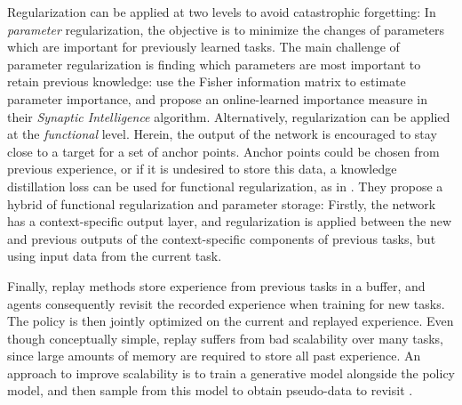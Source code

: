 \documentclass[dvipsnames]{article} %
\newcommand{\commentOLD}[1]{}
\newcommand{\saOLD}[1] {\commentOLD{{\color{cyan} SA: #1}}}                %
\newcommand{\asOLD}[1] {\commentOLD{{\color{orange} AS: #1}}}              %
\begin{document}
Regularization can be applied at two levels to avoid catastrophic forgetting: In \textit{parameter} regularization, the objective is to minimize the changes of parameters which are important for previously learned tasks. The main challenge of parameter regularization is finding which parameters are most important to retain previous knowledge: \citet{ewc} use the Fisher information matrix to estimate parameter importance, and \citet{synapticintelligence} propose an online-learned importance measure in their \textit{Synaptic Intelligence} algorithm. Alternatively, regularization can be applied at the \textit{functional} level. Herein, the output of the network is encouraged to stay close to a target for a set of anchor points. Anchor points could be chosen from previous experience, or if it is undesired to store this data, a knowledge distillation loss can be used for functional regularization, as in \citet{lwf}. They propose a hybrid of functional regularization and parameter storage: \asOLD{ok, and?. Make sure that what you write is informative} Firstly, the network has a context-specific output layer, and regularization is applied between the new and previous outputs of the context-specific components of previous tasks, but using input data from the current task.

Finally, replay methods store experience from previous tasks in a buffer, and agents consequently revisit the recorded experience when training for new tasks. The policy is then jointly optimized on the current and replayed experience. Even though conceptually simple, replay suffers from bad scalability over many tasks, since large amounts of memory are required to store all past experience. An approach to improve scalability is to train a generative model alongside the policy model, and then sample from this model to obtain pseudo-data to revisit \citep{generativeReplay}.

\saOLD{I'm not sure we need to write about LwF. But in any case, it will be beneficial to include an overview of continual RL methods (or those specifically applied to robotics). Check this paper for a review of such methods: \url{https://arxiv.org/pdf/2012.13490.pdf}. I also think that we need a little more content here.}
\end{document}
